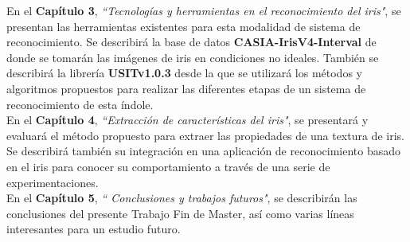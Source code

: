En el \textbf{Capítulo 3}, \emph{``Tecnologías y herramientas en el reconocimiento del iris"}, se presentan las herramientas existentes para esta modalidad de sistema de reconocimiento. Se describirá la base de datos \textbf{CASIA-IrisV4-Interval} de donde se tomarán las imágenes de iris en condiciones no ideales. También se describirá la librería \textbf{USITv1.0.3} desde la que se utilizará los métodos y algoritmos propuestos para realizar las diferentes etapas de un sistema de reconocimiento de esta índole. \\

En el \textbf{Capítulo 4}, \emph{``Extracción de características del iris"}, se presentará y evaluará el método propuesto para extraer las propiedades de una textura de iris. Se describirá también su integración en una aplicación de reconocimiento basado en el iris para conocer su comportamiento a través de una serie de experimentaciones. \\

En el \textbf{Capítulo 5}, \emph{`` Conclusiones y trabajos futuros"}, se describirán las conclusiones del presente Trabajo Fin de Master, así como varias líneas interesantes para un estudio futuro. \\
